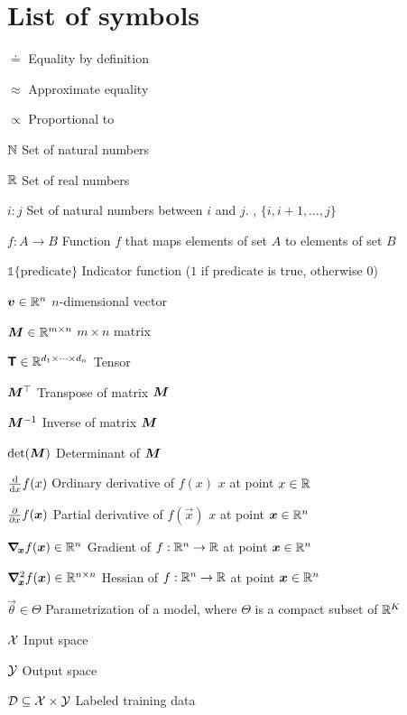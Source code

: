 \section*{List of symbols}

\vspace{10mm}

\begin{abbrv}
    \item[$\doteq$] Equality by definition
    \item[$\approx$] Approximate equality
    \item[$\propto$] Proportional to
    \item[$\N$] Set of natural numbers
    \item[$\R$] Set of real numbers
    \item[$i:j$] Set of natural numbers between $i$ and $j$. \Ie, $\{i, i+1,\ldots,j\}$
    \item[$f: A \to B$] Function $f$ that maps elements of set $A$ to elements of set $B$
    \item[$\mathbb{1}\{\mathrm{predicate}\}$] Indicator function ($1$ if $\mathrm{predicate}$ is true, otherwise $0$)

    \item

    \item[$\vec{v} \in \R^n$] $n$-dimensional vector
    \item[$\mat{M} \in \R^{m\times n}$] $m \times n$ matrix
    \item[$\tens{T} \in \R^{d_1 \times \cdots \times d_n}$] Tensor
    \item[$\transpose{\mat{M}}$] Transpose of matrix $\mat{M}$
    \item[$\inv{\mat{M}}$] Inverse of matrix $\mat{M}$
    \item[$\det{\mat{M}}$] Determinant of $\mat{M}$

    \item

    \item[$\odv*{f(x)}{x}$] Ordinary derivative of $f(x)$ \wrt $x$ at point $x\in\R$
    \item[$\pdv*{f(\vec{x})}{x}$] Partial derivative of $f(\vec{x})$ \wrt $x$ at point $\vec{x}\in\R^n$
    \item[$\grad{f(\vec{x})}{\vec{x}} \in \R^n$] Gradient of $f: \R^n \to \R$ at point $\vec{x}\in\R^n$
    \item[$\hess{f(\vec{x})}{\vec{x}} \in \R^{n\times n}$] Hessian of $f: \R^n \to \R$ at point $\vec{x}\in\R^n$

    \item

    \item[$\vec{\theta} \in \Theta$] Parametrization of a model, where $\Theta$ is a compact subset of $\R^K$
    \item[$\X$] Input space
    \item[$\Y$] Output space
    \item[$\mathcal{D} \subseteq \X \times \Y$] Labeled training data
\end{abbrv}
